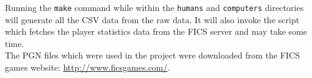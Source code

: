 \documentclass{article}
\begin{document}
Running the \verb=make= command while within the \verb=humans= and \verb=computers= directories will generate all the CSV data from the raw data. It will also invoke the script which fetches the player statistics data from the FICS server and may take some time.\\

The PGN files which were used in the project were downloaded from the FICS games website: \url{http://www.ficsgames.com/}.

\pagebreak


\end{document}
